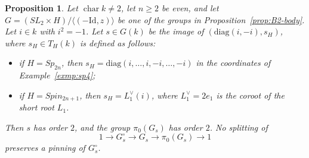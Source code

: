 \documentclass[psamsfonts]{amsart}
\newtheorem{prop}[thm]{Proposition}
\theoremstyle{definition}
\theoremstyle{remark}
\numberwithin{equation}{section}
\newcommand{\diag}{\text{diag}}
\newcommand{\ra}{\rightarrow}
\DeclareMathOperator{\chara}{char}
\numberwithin{equation}{section}
\newcommand{\Id}{\mathrm{Id}}
\theoremstyle{plain}
\begin{document}
\begin{prop}\label{prop:centralizer}
Let $\chara k\neq2$, let $n\geq2$ be even, and let $G=(SL_2\times H)/\langle(-\Id,z)\rangle$ be one of the groups in Proposition~\ref{prop:B2-body}. Let $i\in k$ with $i^2=-1$. Let $s\in G(k)$ be the image of $(\diag(i,-i),s_H)$, where $s_H\in T_H(k)$ is defined as follows:
\begin{itemize}
\item if $H=Sp_{2n}$, then $s_H=\diag(i,\dots,i,-i,\dots,-i)$ in the coordinates of Example~\ref{exmp:sp4};
\item if $H=Spin_{2n+1}$, then $s_H=L_1^\vee(i)$, where $L_1^\vee=2e_1$ is the coroot of the short root $L_1$.
\end{itemize}
Then $s$ has order $2$, and the group $\pi_0(G_s)$ has order $2$. No splitting of
\[
1\ra G_s^{\circ}\ra G_s\ra\pi_0(G_s)\ra1
\]
preserves a pinning of $G_s^{\circ}$.
\end{prop}
\end{document}

